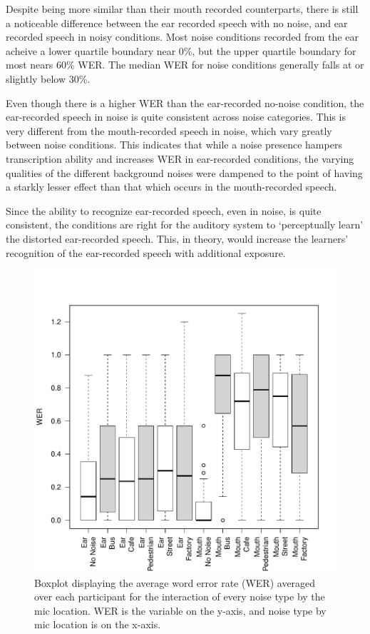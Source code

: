 \documentclass[dissertation,copyright]{uathesis}
\makeatletter
\def\maxwidth{ %
  \ifdim\Gin@nat@width>\linewidth
    \linewidth
  \else
    \Gin@nat@width
  \fi
}
\makeatother
\begin{document}
Despite being more similar than their mouth recorded counterparts, there is still a noticeable difference between the ear recorded speech with no noise, and ear recorded speech in noisy conditions.  Most noise conditions recorded from the ear acheive a lower quartile boundary near 0\%, but the upper quartile boundary for most nears 60\% WER.  The median WER for noise conditions generally falls at or slightly below 30\%. 

Even though there is a higher WER than the ear-recorded no-noise condition, the ear-recorded speech in noise is quite consistent across noise categories.  This is very different from the mouth-recorded speech in noise, which vary greatly between noise conditions.  This indicates that while a noise presence hampers transcription ability and increases WER in ear-recorded conditions, the varying qualities of the different background noises were dampened to the point of having a starkly lesser effect than that which occurs in the mouth-recorded speech.

Since the ability to recognize ear-recorded speech, even in noise, is quite consistent, the conditions are right for the auditory system to `perceptually learn' the distorted ear-recorded speech.  This, in theory, would increase the learners' recognition of the ear-recorded speech with additional exposure.


\begin{figure}[h!]

\includegraphics[width=\maxwidth]{figure/boxplot_noiseXmic2-1} 

\caption{Boxplot displaying the average word error rate (WER) averaged over each participant for the interaction of every noise type by the mic location. WER is the variable on the y-axis, and noise type by mic location is on the x-axis.}
\label{fig:noiseXmic2}
\end{figure}
\end{document}
